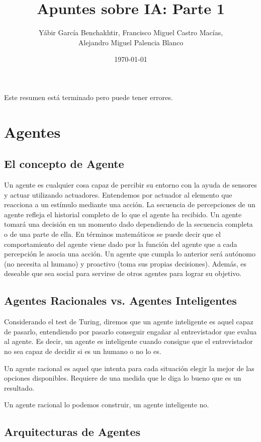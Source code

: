 \documentclass[12pt]{article}
\author{Yábir García Benchakhtir, Francisco Miguel Castro Macías, \\ Alejandro Miguel Palencia Blanco}
\date{\today}
\title{Apuntes sobre IA: Parte 1}
\begin{document}
\setlength{\parindent}{0cm}
\setlength{\parskip}{3mm}

\maketitle

Este resumen está terminado pero puede tener errores.

\section{Agentes}

\subsection{El concepto de Agente}

Un agente es cualquier cosa capaz de percibir su entorno con la ayuda
de sensores y actuar utilizando actuadores. Entendemos por actuador al
elemento que reacciona a un estímulo mediante una acción.  La
secuencia de percepciones de un agente refleja el historial completo
de lo que el agente ha recibido. Un agente tomará una decisión en un
momento dado dependiendo de la secuencia completa o de una parte de
ella. En términos matemáticos se puede decir que el comportamiento del
agente viene dado por la función del agente que a cada percepción le
asocia una acción.  Un agente que cumpla lo anterior será autónomo (no
necesita al humano) y proactivo (toma sus propias decisiones). Además,
es deseable que sea social para servirse de otros agentes para lograr
su objetivo.

\subsection{Agentes Racionales vs. Agentes Inteligentes}

Considerando el test de Turing, diremos que un agente inteligente es
aquel capaz de pasarlo, entendiendo por pasarlo conseguir engañar al
entrevistador que evalua al agente. Es decir, un agente es inteligente
cuando consigue que el entrevistador no sea capaz de decidir si es un
humano o no lo es.

Un agente racional es aquel que intenta para cada situación elegir la
mejor de las opciones disponibles. Requiere de una medida que le diga
lo bueno que es un resultado.

Un agente racional lo podemos construir, un agente inteligente no.

\subsection{Arquitecturas de Agentes}
\end{document}
